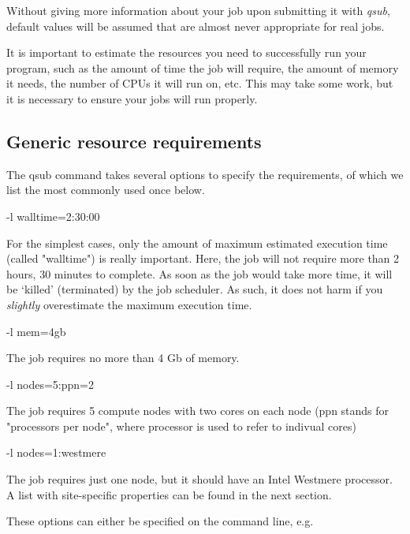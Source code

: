 Without giving more information about your job upon submitting it with \textit{qsub}, default values will be assumed that are almost never appropriate for real jobs.

It is important to estimate the resources you need to successfully run your program, such as the amount of time the job will require, the amount of memory it needs, the number of CPUs it will run on, etc. This may take some work, but it is necessary to ensure your jobs will run properly.

\subsection{Generic resource requirements}

The qsub command takes several options to specify the requirements, of which we list the most commonly used once below.
\begin{prompt}
-l walltime=2:30:00
\end{prompt}

For the simplest cases, only the amount of maximum estimated execution time (called "walltime") is really important. Here, the job will not require more than 2 hours, 30 minutes to complete. As soon as the job would take more time, it will be `killed' (terminated) by the job scheduler.  As such, it does not harm if you \textit{slightly} overestimate the maximum execution time.
\begin{prompt}
-l mem=4gb
\end{prompt}

The job requires no more than 4 Gb of memory.

\begin{prompt}
-l nodes=5:ppn=2
\end{prompt}
The job requires 5 compute nodes with two cores on each node (ppn stands for "processors per node", where processor is used to refer to indivual cores)

\begin{prompt}
-l nodes=1:westmere
\end{prompt}
The job requires just one node, but it should have an Intel Westmere processor. A list with site-specific properties can be found in the next section.

These options can either be specified on the command line, e.g.
\begin{prompt}
$ %
\end{prompt}

